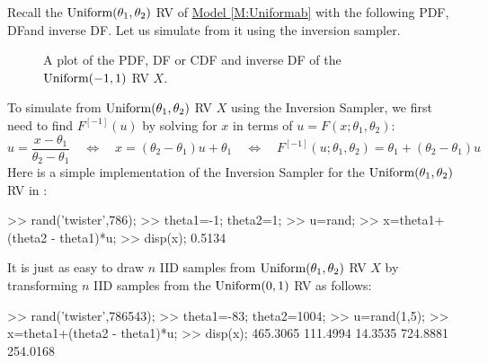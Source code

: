 Recall the $\mbox{{\rm Uniform}}(\theta_1,\theta_2)$ RV of \hyperref[M:Uniformab]{Model \ref*{M:Uniformab}} with the following PDF, DFand inverse DF. Let us simulate from it using the inversion sampler.

\begin{figure}[htpb]
\caption{A plot of the PDF, DF or CDF and inverse DF of the $\mbox{{\rm Uniform}}(-1,1)$ RV $X$.\label{F:unifpm1}}
\centering   {}
\end{figure}

\begin{simulation}\label{SIM:Uniformab}
To simulate from $\mbox{{\rm Uniform}}(\theta_1,\theta_2)$ RV $X$ using the Inversion Sampler, we first need to find $F^{[-1]}(u)$ by solving for $x$ in terms of $u=F(x;\theta_1,\theta_2)$:
\[
u = \frac{x-\theta_1}{\theta_2-\theta_1} \quad \iff  \quad x = (\theta_2-\theta_1)u+\theta_1 \quad  \iff \quad  F^{[-1]}(u;\theta_1,\theta_2) = \theta_1+(\theta_2-\theta_1)u
\]
Here is a simple implementation of the Inversion Sampler for the $\mbox{{\rm Uniform}}(\theta_1,\theta_2)$ RV in \Matlab:
\begin{VrbM}
>> rand('twister',786); %
>> theta1=-1; theta2=1; %
>> u=rand; %
>> x=theta1+(theta2 - theta1)*u; %
>> disp(x); %
    0.5134
\end{VrbM}
It is just as easy to draw $n$ IID samples from $\mbox{{\rm Uniform}}(\theta_1,\theta_2)$ RV $X$ by transforming $n$ IID samples from the $\mbox{{\rm Uniform}}(0,1)$ RV as follows:
\begin{VrbM}
>> rand('twister',786543); %
>> theta1=-83; theta2=1004; %
>> u=rand(1,5); %
>> x=theta1+(theta2 - theta1)*u; %
>> disp(x); %
  465.3065  111.4994   14.3535  724.8881  254.0168
\end{VrbM}
\end{simulation}

